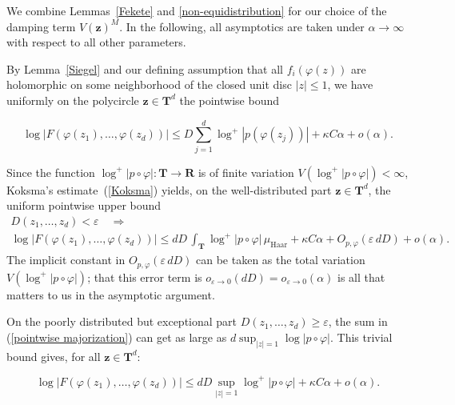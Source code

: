 \documentclass[10pt]{amsart}
\def\T{\mathbf{T}}
\def\R{\mathbf{R}}
\theoremstyle{remark}
\numberwithin{equation}{subsection}
\def\numequation{\addtocounter{subsubsection}{1}\begin{equation}}
\begin{document}
We combine Lemmas~\ref{Fekete} and  \ref{non-equidistribution}  for our choice of the damping term $ V( \mathbf{z})^M$. In the following, all asymptotics are taken  under $\alpha \to \infty$ with respect to all other parameters. 

By Lemma~\ref{Siegel} and our defining assumption that all $f_i(\varphi(z))$ are holomorphic on some neighborhood of the closed unit disc $|z| \leq 1$, we have uniformly on the polycircle $\mathbf{z} \in \T^d$ the 
pointwise bound
\numequation \label{pointwise majorization}
\log{|F(\varphi(z_1), \ldots, \varphi(z_d))|} \leq D \sum_{j=1}^d \log^+{|p(\varphi(z_j))|}
+ \kappa C \alpha + o(\alpha). 
\end{equation}

Since the function $\log^+{|p \circ \varphi|} : \T \to \R$ is  of finite variation $V(\log^+{|p \circ \varphi|}) < \infty$, Koksma's estimate~(\ref{Koksma}) yields, on the well-distributed part $\mathbf{z} \in \T^d$, the uniform pointwise upper bound
\begin{equation*}
\begin{split}
 D(z_1, \ldots, z_d) < \varepsilon \quad \Longrightarrow \\
\log{  |F(\varphi(z_1), \ldots, \varphi(z_d)) | } \leq    d D  \,  \int_{\T} \log^+{ |p \circ \varphi|}  \, \mu_{\mathrm{Haar}}
 + \kappa C \alpha  + O_{p,\varphi} (\varepsilon \, dD)  + o(\alpha).
\end{split}
\end{equation*}
The implicit constant in $O_{p,\varphi}( \varepsilon \, dD)$ can be taken as the total variation  $V(\log^+{|p \circ \varphi|})$; that this error term is $o_{\varepsilon \to 0}( dD) 
= o_{\varepsilon \to 0} (\alpha)$ is all that matters to us in the asymptotic argument. 



On the poorly distributed but exceptional part $D(z_1, \ldots, z_d) \geq \varepsilon$, the  sum in (\ref{pointwise majorization}) can get as large as $d \sup_{|z| = 1} \log{|p \circ \varphi|}$.
This trivial bound gives, for all $ \mathbf{z} \in \T^d$:
\numequation \label{pointwise trivial}
  \log{  |F(\varphi(z_1), \ldots, \varphi(z_d)) | } \leq dD \sup_{|z| = 1} \log^+{|p \circ \varphi|} +  \kappa C \alpha  + o(\alpha). 
\end{equation}
\end{document}
